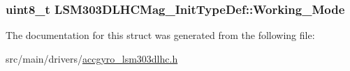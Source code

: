 \hypertarget{structLSM303DLHCMag__InitTypeDef_a8d09b3ff9abb633788f5c869c77b9695}{
\subsubsection[{Working\+\_\+\+Mode}]{\setlength{\rightskip}{0pt plus 5cm}uint8\+\_\+t L\+S\+M303\+D\+L\+H\+C\+Mag\+\_\+\+Init\+Type\+Def\+::\+Working\+\_\+\+Mode}}\label{structLSM303DLHCMag__InitTypeDef_a8d09b3ff9abb633788f5c869c77b9695}


The documentation for this struct was generated from the following file\+:\begin{DoxyCompactItemize}
\item 
src/main/drivers/\hyperlink{accgyro__lsm303dlhc_8h}{accgyro\+\_\+lsm303dlhc.\+h}\end{DoxyCompactItemize}
